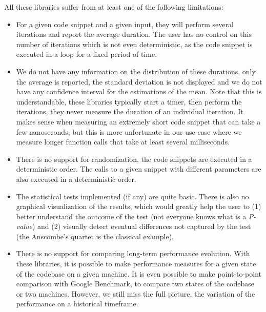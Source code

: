                 All these libraries suffer from at least one of the following limitations:
                \begin{itemize}
                    \item For a given code snippet and a given input, they will perform several iterations and report
                        the average duration. The user has no control on this number of iterations which is not even
                        deterministic, as the code snippet is executed in a loop for a fixed period of time.
                    \item We do not have any information on the distribution of these durations, only the average is
                        reported, the standard deviation is not displayed and we do not have any confidence interval for
                        the estimations of the mean. Note that this is understandable, these libraries typically start a
                        timer, then perform the iterations, they never measure the duration of an individual iteration.
                        It makes sense when measuring an extremely short code snippet that can take a few nanoseconds,
                        but this is more unfortunate in our use case where we measure longer function calls that take at
                        least several milliseconds.
                    \item There is no support for randomization, the code snippets are executed in a deterministic
                        order.  The calls to a given snippet with different parameters are also executed in a
                        deterministic order.
                    \item The statistical tests implemented (if any) are quite basic.  There is also no graphical
                        visualization of the results, which would greatly help the user to (1) better understand the
                        outcome of the test (not everyone knows what is a \emph{P-value}) and (2) visually detect
                        eventual differences not captured by the test (the Anscombe's quartet is the classical example).
                    \item There is no support for comparing long-term performance evolution. With these libraries, it
                        is possible to make performance measures for a given state of the codebase on a given machine.
                        It is even possible to make point-to-point comparison with Google Benchmark, \ie to compare two
                        states of the codebase or two machines. However, we still miss the full picture, the variation
                        of the performance on a historical timeframe.
                \end{itemize}

